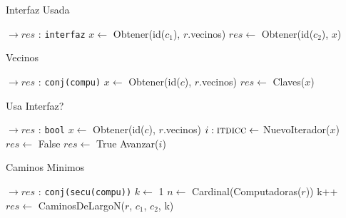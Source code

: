 \begin{Algoritmos}
\begin{algorithm}
\caption{Interfaz Usada}
\begin{algorithmic}[1]
   $\to res$ : \texttt{interfaz}
  \State $x \gets$ Obtener(id($c_1$), $r$.vecinos)
  \State $res \gets$ Obtener(id($c_2$), $x$)
 \EndProcedure
\end{algorithmic}
\end{algorithm}


\begin{algorithm}
\caption{Vecinos}
\begin{algorithmic}[1]
    $\to res$ : \texttt{conj(compu)}
  \State $x \gets$ Obtener(id($c$), $r$.vecinos)
  \State $res \gets$ Claves($x$)
 \EndProcedure
\end{algorithmic}
\end{algorithm}



\begin{algorithm}
\caption{Usa Interfaz?}
\begin{algorithmic}[1]
   $\to res$ : \texttt{bool} 
  \State $x \gets$ Obtener(id($c$), $r$.vecinos)
  \State $i :\textsc{itdicc} \gets$ NuevoIterador($x$)
  \State $res \gets$ False
     $res \gets$ True  \EndIf
    \State Avanzar($i$)
  \EndWhile
 \EndProcedure
\end{algorithmic}
\end{algorithm}


\begin{algorithm}
\caption{Caminos Minimos}
\begin{algorithmic}[1]
   $\to res$ : \texttt{conj(secu(compu))}  
   \State $k \gets$ 1
   \State $n \gets$ Cardinal(Computadoras($r$))
     \State k++
   \EndWhile
   \State $res \gets$ CaminosDeLargoN($r$, $c_1$, $c_2$, k)
\EndProcedure
\end{algorithmic}
\end{algorithm}



\end{Algoritmos}
